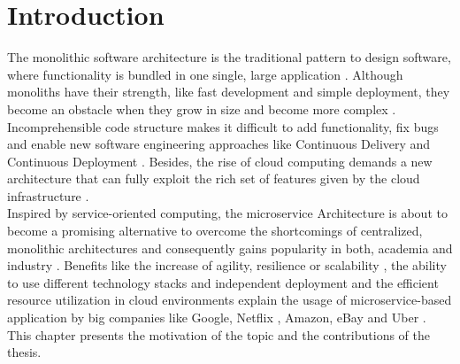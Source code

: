 
\chapter{Introduction}
\label{ch:Introduction}
The monolithic software architecture is the traditional pattern to design software, where functionality is bundled in one single, large application \cite{DataflowDrivenChen}. Although monoliths have their strength, like fast development and simple deployment, they become an obstacle when they grow in size and become more complex \cite{infoq}. Incomprehensible code structure makes it difficult to add functionality, fix bugs and enable new software engineering approaches like Continuous Delivery and Continuous Deployment \cite{cd}. 
Besides, the rise of cloud computing demands a new architecture that can fully exploit the rich set of features given by the cloud infrastructure \cite{MigratingCloud}. \\
Inspired by service-oriented computing, the microservice Architecture is about to become a promising alternative to overcome the shortcomings of centralized, monolithic architectures and consequently gains popularity in both, academia and industry \cite{ObjectAwareAmiri}. Benefits like the increase of agility, resilience or scalability \cite{FunctionalDecompositionHeinrich}, the ability to use different technology stacks and independent deployment \cite{interfaceAnalysisBaresi} and the efficient resource utilization in cloud environments \cite{MigratingCloud} explain the usage of microservice-based application by big companies like Google, Netflix \cite{DevOps}, Amazon, eBay \cite{DataflowDrivenChen} and Uber \cite{FunctionalDecompositionHeinrich}. \\
This chapter presents the motivation of the topic and the contributions of the thesis.


